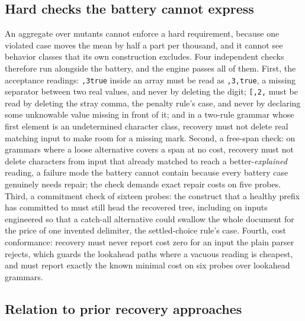 \documentclass[manuscript]{acmart}
\newcommand{\cd}[1]{\texttt{#1}}
\begin{document}
\subsection{Hard checks the battery cannot express}
\label{sec:hardchecks}

An aggregate over mutants cannot enforce a hard requirement, because one violated case moves the mean by half a part per thousand, and it cannot see behavior classes that its own construction excludes. Four independent checks therefore run alongside the battery, and the engine passes all of them. First, the acceptance readings: \cd{,3true} inside an array must be read as \cd{,3,true}, a missing separator between two real values, and never by deleting the digit; \cd{[,2,} must be read by deleting the stray comma, the penalty rule's case, and never by declaring some unknowable value missing in front of it; and in a two-rule grammar whose first element is an undetermined character class, recovery must not delete real matching input to make room for a missing mark. Second, a free-span check: on grammars where a loose alternative covers a span at no cost, recovery must not delete characters from input that already matched to reach a better-\emph{explained} reading, a failure mode the battery cannot contain because every battery case genuinely needs repair; the check demands exact repair costs on five probes. Third, a commitment check of sixteen probes: the construct that a healthy prefix has committed to must still head the recovered tree, including on inputs engineered so that a catch-all alternative could swallow the whole document for the price of one invented delimiter, the settled-choice rule's case. Fourth, cost conformance: recovery must never report cost zero for an input the plain parser rejects, which guards the lookahead paths where a vacuous reading is cheapest, and must report exactly the known minimal cost on six probes over lookahead grammars.

\subsection{Relation to prior recovery approaches}
\label{sec:relatedrecovery}
\end{document}
